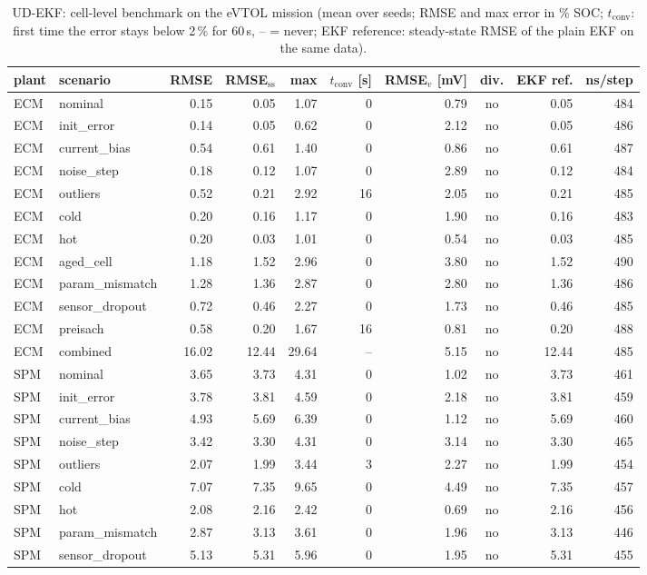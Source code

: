 \begin{table}[H]\centering\footnotesize\setlength{\tabcolsep}{4pt}
\caption{UD-EKF: cell-level benchmark on the eVTOL mission (mean over seeds; RMSE and max error in \% SOC; $t_\mathrm{conv}$: first time the error stays below 2\,\% for 60\,s, -- = never; EKF reference: steady-state RMSE of the plain EKF on the same data).}\label{tab:cell_UDEKF}
\begin{tabular}{llrrrrrcrr}\toprule
plant & scenario & RMSE & RMSE$_\mathrm{ss}$ & max & $t_\mathrm{conv}$ [s] & RMSE$_v$ [mV] & div. & EKF ref. & ns/step \\ \midrule
ECM & nominal & 0.15 & 0.05 & 1.07 & 0 & 0.79 & no & 0.05 & 484 \\
ECM & init\_error & 0.14 & 0.05 & 0.62 & 0 & 2.12 & no & 0.05 & 486 \\
ECM & current\_bias & 0.54 & 0.61 & 1.40 & 0 & 0.86 & no & 0.61 & 487 \\
ECM & noise\_step & 0.18 & 0.12 & 1.07 & 0 & 2.89 & no & 0.12 & 484 \\
ECM & outliers & 0.52 & 0.21 & 2.92 & 16 & 2.05 & no & 0.21 & 485 \\
ECM & cold & 0.20 & 0.16 & 1.17 & 0 & 1.90 & no & 0.16 & 483 \\
ECM & hot & 0.20 & 0.03 & 1.01 & 0 & 0.54 & no & 0.03 & 485 \\
ECM & aged\_cell & 1.18 & 1.52 & 2.96 & 0 & 3.80 & no & 1.52 & 490 \\
ECM & param\_mismatch & 1.28 & 1.36 & 2.87 & 0 & 2.80 & no & 1.36 & 486 \\
ECM & sensor\_dropout & 0.72 & 0.46 & 2.27 & 0 & 1.73 & no & 0.46 & 485 \\
ECM & preisach & 0.58 & 0.20 & 1.67 & 16 & 0.81 & no & 0.20 & 488 \\
ECM & combined & 16.02 & 12.44 & 29.64 & -- & 5.15 & no & 12.44 & 485 \\
\midrule
SPM & nominal & 3.65 & 3.73 & 4.31 & 0 & 1.02 & no & 3.73 & 461 \\
SPM & init\_error & 3.78 & 3.81 & 4.59 & 0 & 2.18 & no & 3.81 & 459 \\
SPM & current\_bias & 4.93 & 5.69 & 6.39 & 0 & 1.12 & no & 5.69 & 460 \\
SPM & noise\_step & 3.42 & 3.30 & 4.31 & 0 & 3.14 & no & 3.30 & 465 \\
SPM & outliers & 2.07 & 1.99 & 3.44 & 3 & 2.27 & no & 1.99 & 454 \\
SPM & cold & 7.07 & 7.35 & 9.65 & 0 & 4.49 & no & 7.35 & 457 \\
SPM & hot & 2.08 & 2.16 & 2.42 & 0 & 0.69 & no & 2.16 & 456 \\
SPM & param\_mismatch & 2.87 & 3.13 & 3.61 & 0 & 1.96 & no & 3.13 & 446 \\
SPM & sensor\_dropout & 5.13 & 5.31 & 5.96 & 0 & 1.95 & no & 5.31 & 455 \\
\bottomrule\end{tabular}\end{table}
